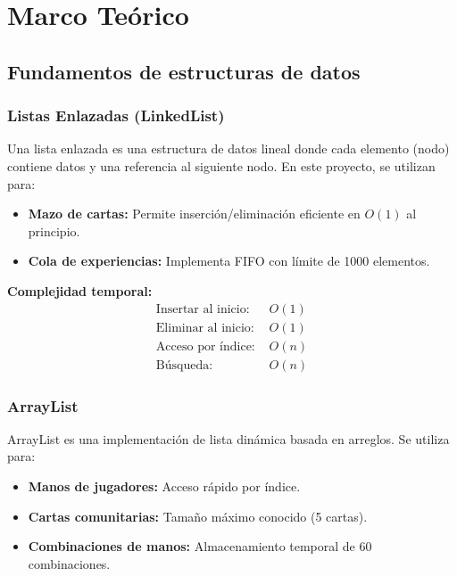\documentclass[12pt,a4paper]{article}
\begin{document}
\newpage

\section{Marco Teórico}

\subsection{Fundamentos de estructuras de datos}

\subsubsection{Listas Enlazadas (LinkedList)}

Una lista enlazada es una estructura de datos lineal donde cada elemento (nodo) contiene datos y una referencia al siguiente nodo. En este proyecto, se utilizan para:

\begin{itemize}
    \item \textbf{Mazo de cartas:} Permite inserción/eliminación eficiente en $O(1)$ al principio.
    \item \textbf{Cola de experiencias:} Implementa FIFO con límite de 1000 elementos.
\end{itemize}

\textbf{Complejidad temporal:}
\begin{align}
    \text{Insertar al inicio: } &O(1) \\
    \text{Eliminar al inicio: } &O(1) \\
    \text{Acceso por índice: } &O(n) \\
    \text{Búsqueda: } &O(n)
\end{align}

\subsubsection{ArrayList}

ArrayList es una implementación de lista dinámica basada en arreglos. Se utiliza para:

\begin{itemize}
    \item \textbf{Manos de jugadores:} Acceso rápido por índice.
    \item \textbf{Cartas comunitarias:} Tamaño máximo conocido (5 cartas).
    \item \textbf{Combinaciones de manos:} Almacenamiento temporal de 60 combinaciones.
\end{itemize}
\end{document}
